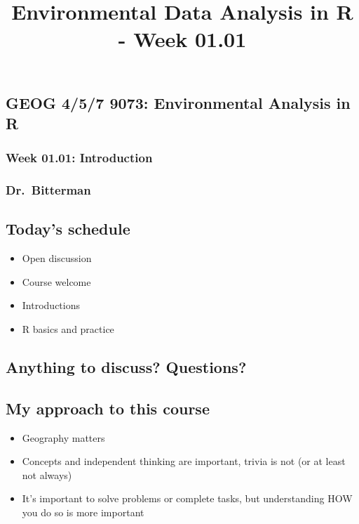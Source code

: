 \documentclass[
  letterpaper,
  DIV=11,
  numbers=noendperiod]{scrartcl}
\title{Environmental Data Analysis in R - Week 01.01}
\author{}
\date{}
\providecommand{\tightlist}{%
  \setlength{\itemsep}{0pt}\setlength{\parskip}{0pt}}
\begin{document}
\maketitle


\subsection{GEOG 4/5/7 9073: Environmental Analysis in
R}\label{geog-457-9073-environmental-analysis-in-r}

\subsubsection{Week 01.01: Introduction}\label{week-01.01-introduction}

\subsubsection{Dr.~Bitterman}\label{dr.-bitterman}

\subsection{Today's schedule}\label{todays-schedule}

\begin{itemize}
\tightlist
\item
  Open discussion
\item
  Course welcome
\item
  Introductions
\item
  R basics and practice
\end{itemize}

\subsection{Anything to discuss?
Questions?}\label{anything-to-discuss-questions}

\subsection{My approach to this
course}\label{my-approach-to-this-course}

\begin{itemize}
\tightlist
\item
  Geography matters
\item
  Concepts and independent thinking are important, trivia is not (or at
  least not always)
\item
  It's important to solve problems or complete tasks, but understanding
  HOW you do so is more important
\end{itemize}
\end{document}
